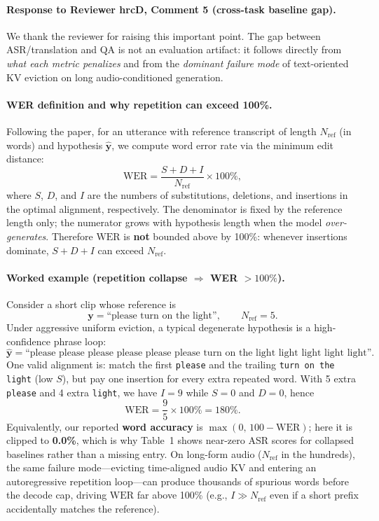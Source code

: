 
\begin{answer}
\paragraph{Response to Reviewer hrcD, Comment 5 (cross-task baseline gap).}
We thank the reviewer for raising this important point.
The gap between ASR/translation and QA is not an evaluation artifact: it follows directly from \emph{what each metric penalizes} and from the \emph{dominant failure mode} of text-oriented KV eviction on long audio-conditioned generation.

\paragraph{WER definition and why repetition can exceed 100\%.}
Following the paper, for an utterance with reference transcript of length $N_{\mathrm{ref}}$ (in words) and hypothesis $\hat{\mathbf{y}}$, we compute word error rate via the minimum edit distance:
\begin{equation}
\mathrm{WER}
=
\frac{S + D + I}{N_{\mathrm{ref}}}
\times 100\%,
\label{eq:wer-rebuttal}
\end{equation}
where $S$, $D$, and $I$ are the numbers of substitutions, deletions, and insertions in the optimal alignment, respectively.
The denominator is fixed by the reference length only; the numerator grows with hypothesis length when the model \emph{over-generates}.
Therefore $\mathrm{WER}$ is \textbf{not} bounded above by 100\%: whenever insertions dominate, $S+D+I$ can exceed $N_{\mathrm{ref}}$.

\paragraph{Worked example (repetition collapse $\Rightarrow$ WER $> 100\%$).}
Consider a short clip whose reference is
\[
\mathbf{y}=\text{``please turn on the light''},\qquad N_{\mathrm{ref}}=5.
\]
Under aggressive uniform eviction, a typical degenerate hypothesis is a high-confidence phrase loop:
\[
\hat{\mathbf{y}}=\text{``please please please please please please turn on the light light light light light''}.
\]
One valid alignment is: match the first \texttt{please} and the trailing \texttt{turn on the light} (low $S$), but pay one insertion for every extra repeated word.
With 5 extra \texttt{please} and 4 extra \texttt{light}, we have $I=9$ while $S{=}0$ and $D{=}0$, hence
\[
\mathrm{WER}=\frac{9}{5}\times 100\%=180\%.
\]
Equivalently, our reported \textbf{word accuracy} is $\max(0,\,100-\mathrm{WER})$; here it is clipped to \textbf{0.0\%}, which is why Table~1 shows near-zero ASR scores for collapsed baselines rather than a missing entry.
On long-form audio ($N_{\mathrm{ref}}$ in the hundreds), the same failure mode---evicting time-aligned audio KV and entering an autoregressive repetition loop---can produce thousands of spurious words before the decode cap, driving $\mathrm{WER}$ far above 100\% (e.g., $I \gg N_{\mathrm{ref}}$ even if a short prefix accidentally matches the reference).


\end{answer}
